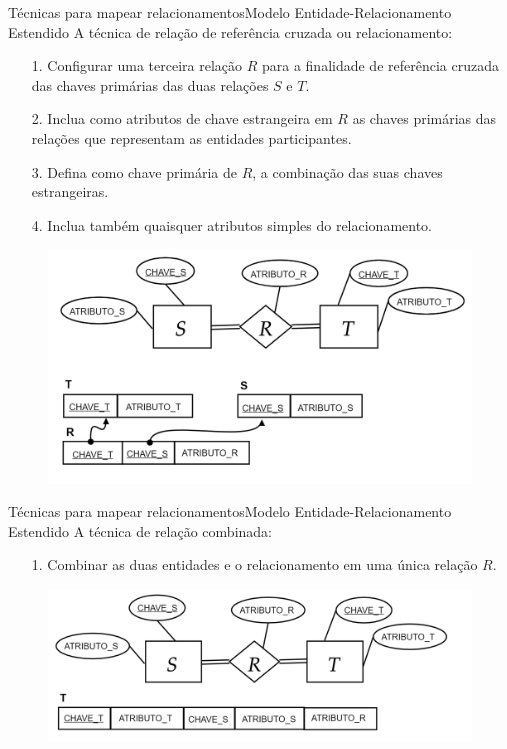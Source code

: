\documentclass[t]{beamer}
\begin{document}
\begin{ftst}{Técnicas para mapear relacionamentos}{Modelo Entidade-Relacionamento Estendido}
A técnica de relação de referência cruzada ou relacionamento:
\footnotesize
\begin{itemize}
    \item[1.] Configurar uma terceira relação $R$ para a finalidade de referência cruzada das chaves primárias das duas relações $S$ e $T$.
    \item[2.] Inclua como atributos de chave estrangeira em $R$ as chaves primárias das relações que representam as entidades participantes.
    \item[3.] Defina como chave primária de $R$, a combinação das suas chaves estrangeiras.
    \item[4.] Inclua também quaisquer atributos simples do relacionamento.

\end{itemize}
\begin{figure}
    \includegraphics[scale=0.15]{Figuras/03_07.png}
\end{figure}
\end{ftst}


\begin{ftst}{Técnicas para mapear relacionamentos}{Modelo Entidade-Relacionamento Estendido}
A técnica de relação combinada:
\footnotesize
\begin{itemize}
    \item[1.] Combinar as duas entidades e o relacionamento em uma única relação $R$.
\end{itemize}
\begin{figure}
    \includegraphics[scale=0.17]{Figuras/03_08.png}
\end{figure}
\end{ftst}
\end{document}
